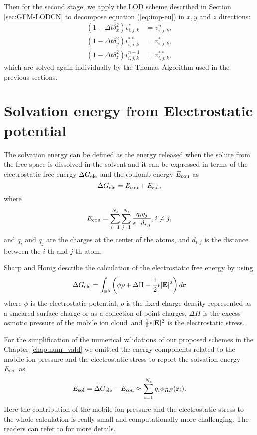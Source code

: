  Then for the second stage, we apply the LOD scheme described in Section \ref{sec:GFM-LODCN} to decompose equation (\ref{eq:imp-eu}) in $x,y$ and $z$ directions:
 \begin{eqnarray}
		(1-\Delta t \delta_x^2)v^*_{i,j,k} &= v^n_{i,j,k},\nonumber\\
		(1-\Delta t \delta_y^2)v^{**}_{i,j,k} &= v^*_{i,j,k},\\
		(1-\Delta t \delta_z^2)v^{n+1}_{i,j,k} &= v^{**}_{i,j,k},\nonumber
\end{eqnarray}	
which are solved again individually by the Thomas Algorithm used in the previous sections. 

\section{Solvation energy from Electrostatic potential}

The solvation energy can be defined as the energy released when the solute from the free space is dissolved in the solvent and it can be expressed in terms of the electrostatic free energy $\Delta G_{\rm ele}$ and the coulomb energy $E_{\rm cou}$ as
\begin{equation}
	\Delta G_{\rm ele}= E_{\rm cou}+ E_{\rm sol},\label{eq_Gele}
\end{equation}
where
\begin{equation}	
	E_{\rm cou} = \sum_{i=1}^{N_c}\sum_{j=1}^{N_c}\frac{q_iq_j}{\epsilon^-d_{i,j}}, i\neq j,\label{eq_Ecou}
\end{equation}
and $q_i$ and $q_j$ are the charges at the center of the atoms, and $d_{i,j}$ is the distance between the $i$-th and $j$-th atom. 

Sharp and Honig \cite{Sharp_Honig} describe the calculation of the electrostatic free energy by using 
\begin{equation}
\Delta G_{\rm ele}=\int_{\mathbb{R}^3}\left(\phi\rho+\Delta\Pi-\frac{1}{2}\epsilon|{\bf E}|^2\right)d{\bf r}
\end{equation}
where $\phi$ is the electrostatic potential, $\rho$ is the fixed charge density represented as a smeared surface charge or as a collection of point charges, $\Delta\Pi$ is  the excess osmotic pressure of the mobile ion cloud, and $\frac{1}{2}\epsilon|{\bf E}|^2$ is the electrostatic stress.

For the simplification of the numerical validations of our proposed schemes in the Chapter \ref{chap:num_vald} we omitted the energy components related to the mobile ion pressure and the electrostatic stress to report the solvation energy $E_{\rm sol}$ as  
\begin{equation}
	E_{\rm sol}=\Delta G_{\rm ele}-E_{\rm cou}\approx\sum\limits_{i=1}^{N_c}q_i\phi_{RF} ({\bf r}_i).\label{eq:solvation}
\end{equation}
Here the contribution of the mobile ion pressure and the electrostatic stress to the whole calculation is really small and computationally more challenging. The readers can refer to \cite{GENG_WEI2011,Gilson,Sharp_Honig} for more details.	 
